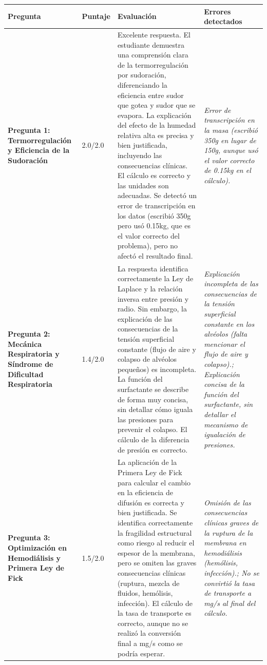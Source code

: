 \documentclass[11pt,a4paper]{article}
\begin{document}
\begin{longtable}{>{\bfseries}p{2.8cm} p{1.6cm} p{7.0cm} p{2.8cm}}
  \toprule
  \textbf{Pregunta} & \textbf{Puntaje} & \textbf{Evaluación} & \textbf{Errores detectados} \\
  \midrule
  \endhead
  \bottomrule
  \endfoot
    \textbf{Pregunta 1: Termorregulación y Eficiencia de la Sudoración} & 2.0/2.0 & Excelente respuesta. El estudiante demuestra una comprensión clara de la termorregulación por sudoración, diferenciando la eficiencia entre sudor que gotea y sudor que se evapora. La explicación del efecto de la humedad relativa alta es precisa y bien justificada, incluyendo las consecuencias clínicas. El cálculo es correcto y las unidades son adecuadas. Se detectó un error de transcripción en los datos (escribió 350g pero usó 0.15kg, que es el valor correcto del problema), pero no afectó el resultado final. & \textit{Error de transcripción en la masa (escribió 350g en lugar de 150g, aunque usó el valor correcto de 0.15kg en el cálculo).} \\
    \midrule
    \textbf{Pregunta 2: Mecánica Respiratoria y Síndrome de Dificultad Respiratoria} & 1.4/2.0 & La respuesta identifica correctamente la Ley de Laplace y la relación inversa entre presión y radio. Sin embargo, la explicación de las consecuencias de la tensión superficial constante (flujo de aire y colapso de alvéolos pequeños) es incompleta. La función del surfactante se describe de forma muy concisa, sin detallar cómo iguala las presiones para prevenir el colapso. El cálculo de la diferencia de presión es correcto. & \textit{Explicación incompleta de las consecuencias de la tensión superficial constante en los alvéolos (falta mencionar el flujo de aire y colapso).; Explicación concisa de la función del surfactante, sin detallar el mecanismo de igualación de presiones.} \\
    \midrule
    \textbf{Pregunta 3: Optimización en Hemodiálisis y Primera Ley de Fick} & 1.5/2.0 & La aplicación de la Primera Ley de Fick para calcular el cambio en la eficiencia de difusión es correcta y bien justificada. Se identifica correctamente la fragilidad estructural como riesgo al reducir el espesor de la membrana, pero se omiten las graves consecuencias clínicas (ruptura, mezcla de fluidos, hemólisis, infección). El cálculo de la tasa de transporte es correcto, aunque no se realizó la conversión final a mg/s como se podría esperar. & \textit{Omisión de las consecuencias clínicas graves de la ruptura de la membrana en hemodiálisis (hemólisis, infección).; No se convirtió la tasa de transporte a mg/s al final del cálculo.} \\

\end{longtable}
\end{document}
